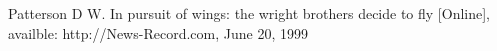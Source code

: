 \begin{thebibliography}{1}
 Patterson D W. In pursuit of wings: the wright brothers decide to fly [Online], availble: http://News-Record.com, June 20, 1999

\end{thebibliography}